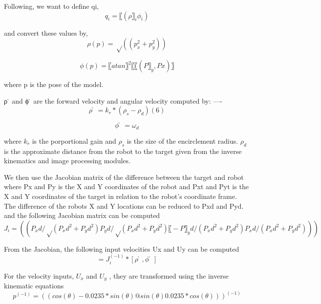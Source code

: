 Following, we want to define qi,
\begin{equation}
	q_i=〖(ρ〗_i  ϕ_i)
\end{equation}
	
and convert these values by,
\begin{equation}
	ρ(p)=√((p_x^2+p_y^2 ) )
\end{equation}
	
\begin{equation}
	ϕ(p)=〖atan〗^2⁡〖〖(P〗_y,Px) 〗
\end{equation}
	

where p is the pose of the model.

ρ ̇ and ϕ ̇ are the forward velocity and angular velocity computed by:
----
\begin{equation}
	ρ ̇=k_r*(ρ_s- ρ_d)	(6)
\end{equation}
		
\begin{equation}
	ϕ ̇=ω_d
\end{equation}
	

where $k_r$  is the porportional gain and $ρ_s$ is the size of the encirclement radius. $ρ_d$ is the approximate distance from the robot to the target given from the inverse kinematics and image processing modules.

We then use the Jacobian matrix of the difference between the target and robot where Px and Py is the X and Y coordinates of the robot and Pxt and Pyt is the X and Y coordinates of the target in relation to the robot’s coordinate frame. The difference of the robots X and Y locations can be reduced to Pxd and Pyd. and the following Jacobian  matrix can be computed
\begin{equation}
		J_i=((P_xd/√(P_xd^2+P_yd^2 )  P_yd/√(P_xd^2+P_yd^2 )  〖-P〗_yd/(P_xd^2+P_yd^2 )P_xd/(P_xd^2+P_yd^2 )))   
\end{equation}


	


From the Jacobian, the following input velocities Ux and Uy can be computed
\begin{equation}
		[U_x,U_y ]=J_i^(-1)*[ρ ̇,ϕ ̇]
\end{equation}
	
For the velocity inputs, $U_x$ and $U_y$ , they are transformed using the inverse kinematic equations
\begin{equation}
			p^(-1)=((cos⁡(θ)-0.0235*sin⁡(θ)@sin⁡(θ)0.0235*cos⁡(θ) ))^(-1)
\end{equation}
	

